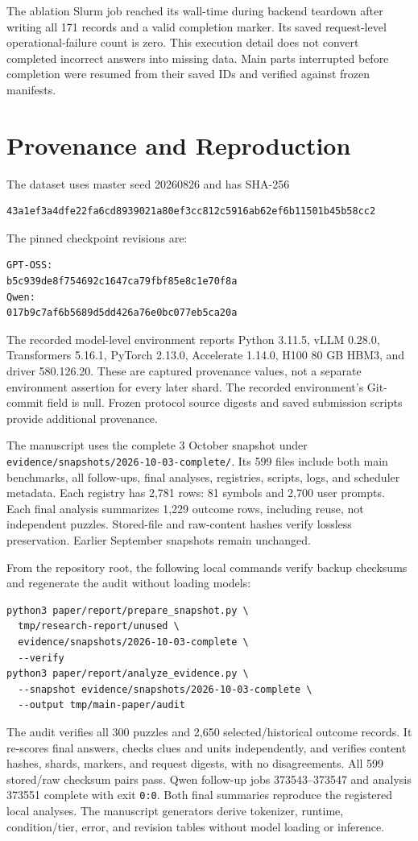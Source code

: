 \documentclass[11pt]{article}
\begin{document}
The ablation Slurm job reached its wall-time during backend teardown after writing all 171 records and a valid completion marker. Its saved request-level operational-failure count is zero. This execution detail does not convert completed incorrect answers into missing data. Main parts interrupted before completion were resumed from their saved IDs and verified against frozen manifests.

\section{Provenance and Reproduction}\label{app:repro}
The dataset uses master seed 20260826 and has SHA-256
\begin{Verbatim}[fontsize=\footnotesize,breaklines=true,breakanywhere=true]
43a1ef3a4dfe22fa6cd8939021a80ef3cc812c5916ab62ef6b11501b45b58cc2
\end{Verbatim}
The pinned checkpoint revisions are:
\begin{Verbatim}[fontsize=\footnotesize,breaklines=true,breakanywhere=true]
GPT-OSS:
b5c939de8f754692c1647ca79fbf85e8c1e70f8a
Qwen:
017b9c7af6b5689d5dd426a76e0bc077eb5ca20a
\end{Verbatim}
The recorded model-level environment reports Python 3.11.5, vLLM 0.28.0, Transformers 5.16.1, PyTorch 2.13.0, Accelerate 1.14.0, H100 80 GB HBM3, and driver 580.126.20. These are captured provenance values, not a separate environment assertion for every later shard. The recorded environment's Git-commit field is null. Frozen protocol source digests and saved submission scripts provide additional provenance.

The manuscript uses the complete 3 October snapshot under \texttt{evidence/snapshots/2026-10-03-complete/}. Its 599 files include both main benchmarks, all follow-ups, final analyses, registries, scripts, logs, and scheduler metadata. Each registry has 2,781 rows: 81 symbols and 2,700 user prompts. Each final analysis summarizes 1,229 outcome rows, including reuse, not independent puzzles. Stored-file and raw-content hashes verify lossless preservation. Earlier September snapshots remain unchanged.

From the repository root, the following local commands verify backup checksums and regenerate the audit without loading models:
\begin{Verbatim}[fontsize=\footnotesize,breaklines=true,breakanywhere=true]
python3 paper/report/prepare_snapshot.py \
  tmp/research-report/unused \
  evidence/snapshots/2026-10-03-complete \
  --verify
python3 paper/report/analyze_evidence.py \
  --snapshot evidence/snapshots/2026-10-03-complete \
  --output tmp/main-paper/audit
\end{Verbatim}
The audit verifies all 300 puzzles and 2,650 selected/historical outcome records. It re-scores final answers, checks clues and units independently, and verifies content hashes, shards, markers, and request digests, with no disagreements. All 599 stored/raw checksum pairs pass. Qwen follow-up jobs 373543--373547 and analysis 373551 complete with exit \texttt{0:0}. Both final summaries reproduce the registered local analyses. The manuscript generators derive tokenizer, runtime, condition/tier, error, and revision tables without model loading or inference.
\end{document}
